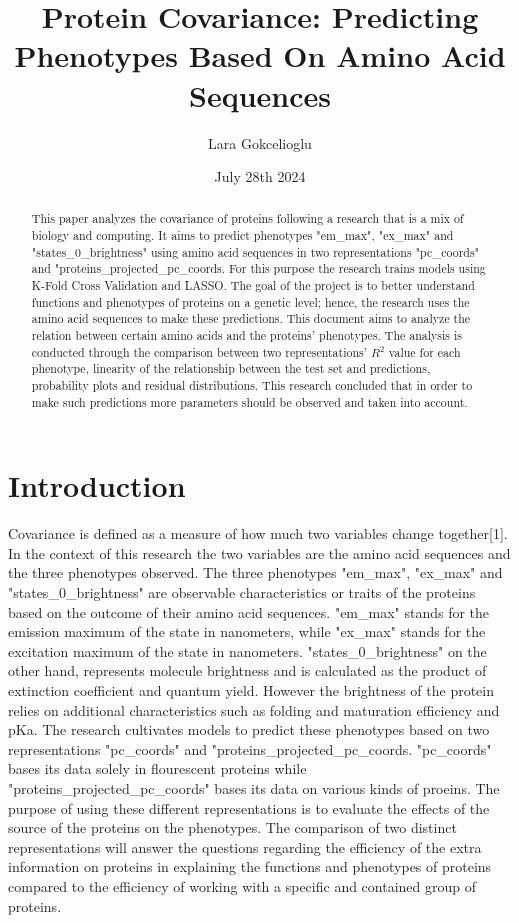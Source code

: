 \documentclass{article}
\begin{document}
\title{Protein Covariance: Predicting Phenotypes Based On Amino Acid Sequences}


\author{Lara Gokcelioglu}

\date{July 28th 2024}
\maketitle
\begin{abstract}
This paper analyzes the covariance of proteins following a research that is a mix of biology and computing. It aims to predict phenotypes "em\_max", "ex\_max" and "states\_0\_brightness" using amino acid sequences in two representations "pc\_coords" and "proteins\_projected\_pc\_coords. For this purpose the research trains models using K-Fold Cross Validation and LASSO. The goal of the project is to better understand functions and phenotypes of proteins on a genetic level; hence, the research uses the amino acid sequences to make these predictions. This document aims to analyze the relation between certain amino acids and the proteins' phenotypes. The analysis is conducted through the comparison between two representations' $R^2$ value for each phenotype, linearity of the relationship between the test set and predictions, probability plots and residual distributions. This research concluded that in order to make such predictions more parameters should be observed and taken into account.
\end{abstract}

\section{Introduction}
Covariance is defined as a measure of how much two variables change together[1]. In the context of this research the two variables are the amino acid sequences and the three phenotypes observed. The three phenotypes "em\_max", "ex\_max" and "states\_0\_brightness" are observable characteristics or traits of the proteins based on the outcome of their amino acid sequences. "em\_max" stands for the emission maximum of the state in nanometers, while "ex\_max" stands for the excitation maximum of the state in nanometers. "states\_0\_brightness" on the other hand, represents molecule brightness and is calculated as the product of extinction coefficient and quantum yield. However the brightness of the protein relies on additional characteristics such as folding and maturation efficiency and pKa. The research cultivates models to predict these phenotypes based on two representations "pc\_coords" and "proteins\_projected\_pc\_coords. "pc\_coords" bases its data solely in flourescent proteins while "proteins\_projected\_pc\_coords" bases its data on various kinds of proeins. The purpose of using these different representations is to evaluate the effects of the source of the proteins on the phenotypes. The comparison of two distinct representations will answer the questions regarding the efficiency of the extra information on proteins in explaining the functions and phenotypes of proteins compared to the efficiency of working with a specific and contained group of proteins.
\end{document}

